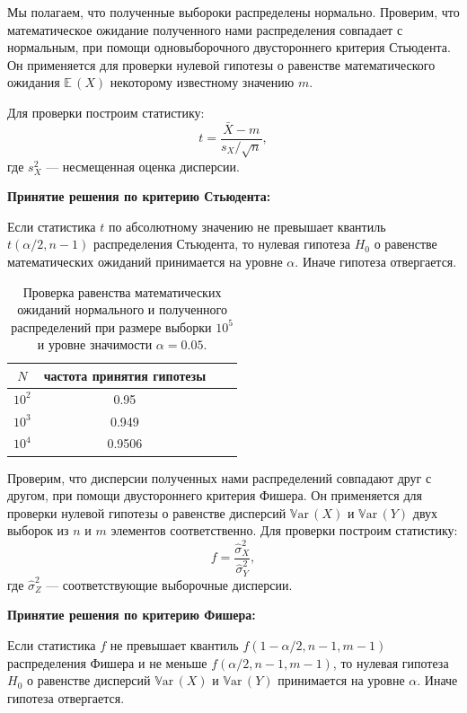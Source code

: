 \documentclass[oneside, final, 12pt]{article}
\def\Var{{\mathbb{V}\textrm{ar}}\,}
\def\E{{\mathbb{E} }\,}
\begin{document}
	\newpage
	Мы полагаем, что полученные выбороки распределены нормально. Проверим, что 
	математическое ожидание полученного нами распределения совпадает с нормальным, при помощи  
	одновыборочного двустороннего критерия Стьюдента. 
	Он применяется для проверки нулевой гипотезы о равенстве
	математического ожидания $\E(X)$ некоторому известному значению $m$.
	
	Для проверки построим статистику:
	$$
		t = \dfrac{\bar{X}-m}{s_X/\sqrt{n}},
	$$
	 где	$s^2_X$ --- несмещенная оценка дисперсии.

	\textbf{Принятие решения по критерию Стьюдента:}

	Если статистика $t$ по абсолютному значению
	не превышает квантиль $t(\alpha/2, n-1)$ распределения Стьюдента,
	то нулевая гипотеза $H_{0}$ о равенстве математических ожиданий принимается на уровне $\alpha$. 
	Иначе гипотеза отвергается. 
	
	\begin{table}[h!]
	\begin{center}
		\begin{tabular}{|c|c|c|c|}
			\hline $N$ & частота принятия гипотезы \\ \hline
				$10^2$ & 0.95  \\ \hline
				$10^3$ & 0.949 \\ \hline
				$10^4$ & 0.9506 \\ \hline
		\end{tabular}
		\caption{ \centering  Проверка равенства математических ожиданий нормального 
											и полученного распределений при размере выборки $10^5$ 
											и уровне значимости $\alpha=0.05.$}
	\end{center}
	\end{table}

	Проверим, что дисперсии полученных нами распределений совпадают друг с другом, при помощи  
	двустороннего критерия Фишера. 
	Он применяется для проверки нулевой гипотезы о равенстве
	дисперсий $\Var(X)$ и $\Var(Y)$ двух выборок из $n$ и $m$ элементов соответственно.
	\newpage
	Для проверки построим статистику:
	$$
		f = \frac{\hat{\sigma}_X^2}{\hat{\sigma}_Y^2},
	$$
	 где	$\hat{\sigma}_Z^2$ --- соответствующие выборочные дисперсии.

	\textbf{Принятие решения по критерию Фишера:}

	Если статистика $f$ не превышает квантиль $f(1-\alpha/2, n-1, m-1)$ распределения Фишера и
									 не меньше $f(\alpha/2, n-1, m-1)$, то нулевая гипотеза $H_{0}$ 
	о равенстве дисперсий $\Var(X)$ и $\Var(Y)$ принимается на уровне $\alpha$. 
	Иначе гипотеза отвергается. 
	
\end{document}
